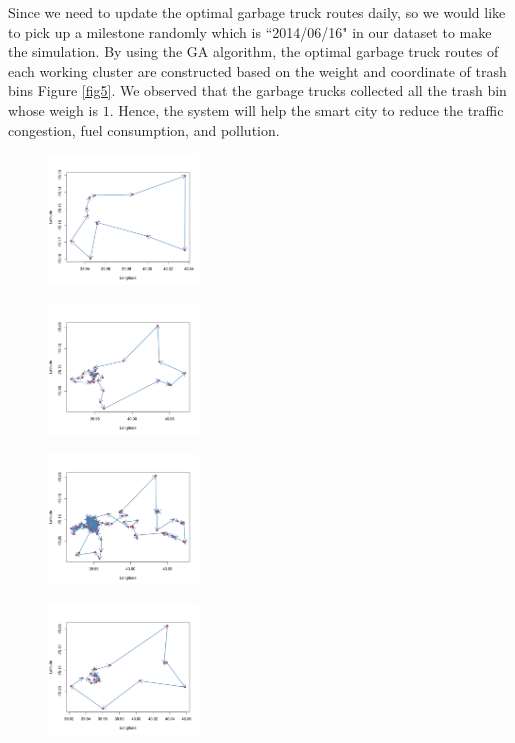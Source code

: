 \documentclass[conference,compsoc]{IEEEtran}
\begin{document}
\par Since we need to update the optimal garbage truck routes daily, so we would like to pick up a milestone randomly which is ``2014/06/16" in our dataset to make the simulation. By using the GA algorithm, the optimal garbage truck routes of each working cluster are constructed based on the weight and coordinate of trash bins Figure \ref{fig5}. We observed that the garbage trucks collected all the trash bin whose weigh is $1$. Hence, the system will help the smart city to reduce the traffic congestion, fuel consumption, and pollution.

 
\begin{figure}
	\centering
	\parbox{5cm}{
		\includegraphics[width=4cm]{Cluster1}
		\label{fig1a}}
	\begin{minipage}{3cm}
		\includegraphics[width=4cm]{Cluster2}
		\label{fig1b}
	\end{minipage}
	
	\parbox{5cm}{
		\includegraphics[width=4cm]{Cluster3}
		\label{fig1a}}
	\begin{minipage}{3cm}
		\includegraphics[width=4cm]{Cluster4}
		\label{fig1b}
	\end{minipage}
	

\end{figure}
\end{document}
